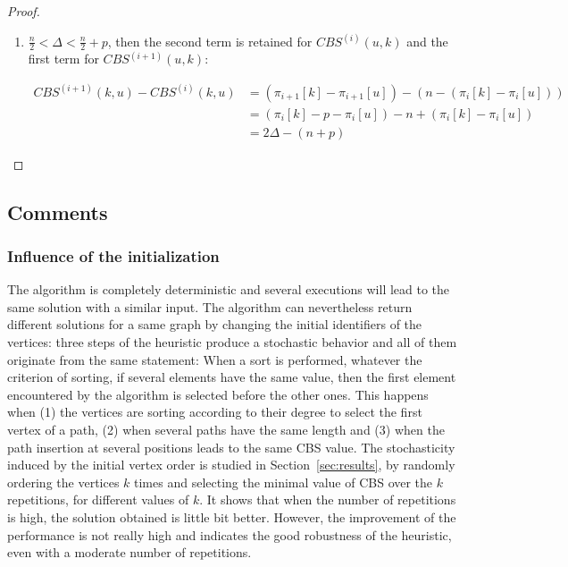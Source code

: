 \documentclass{scrartcl}
\theoremstyle{plain}
\newcommand{\cbs}{CBS}
\begin{document}
\begin{proof}
\begin{enumerate}
\item $\frac{n}{2} < \Delta < \frac{n}{2} + p$, then the second term is 
retained for $\cbs{}^{(i)}(u,k)$ and the first term for $\cbs{}^{(i+1)}(u,k)$:

\begin{align}
\cbs{}^{(i+1)}(k,u) - \cbs{}^{(i)}(k,u) &= (\pi_{i+1}[k] - \pi_{i+1}[u]) - (n - 
(\pi_{i}[k] - \pi_{i}[u])) \\ \nonumber
&= (\pi_i[k] - p - \pi_i[u]) - n + (\pi_{i}[k] - \pi_{i}[u]) \\ \nonumber
&= 2\Delta - (n+p)
\end{align}

\end{enumerate}

\end{proof}


\subsection{Comments}

\subsubsection{Influence of the initialization}

The algorithm is completely deterministic and several executions will lead to 
the same solution with a similar input. The algorithm can nevertheless return 
different solutions for a same graph by changing the initial identifiers of the 
vertices:  three steps of the heuristic produce a stochastic behavior and all of 
them originate from the same statement: When a sort is performed, whatever the 
criterion of sorting, if several elements have the same value, then the first 
element encountered by the algorithm is selected before the other ones. This 
happens when (1) the vertices are sorting according to their degree to select 
the first vertex of a path, (2) when several paths have the same length and (3) 
when the path insertion at several positions leads to the same CBS value. The 
stochasticity induced by the initial vertex order is studied in 
Section~\ref{sec:results}, by randomly ordering the vertices $k$ times and 
selecting the minimal value of \cbs{} over the $k$ repetitions, for different 
values of $k$. It shows that when the number of repetitions is high, the 
solution obtained is little bit better. However, the improvement of the 
performance is not really high and indicates the good robustness of the 
heuristic, even with a moderate number of repetitions.
\end{document}
